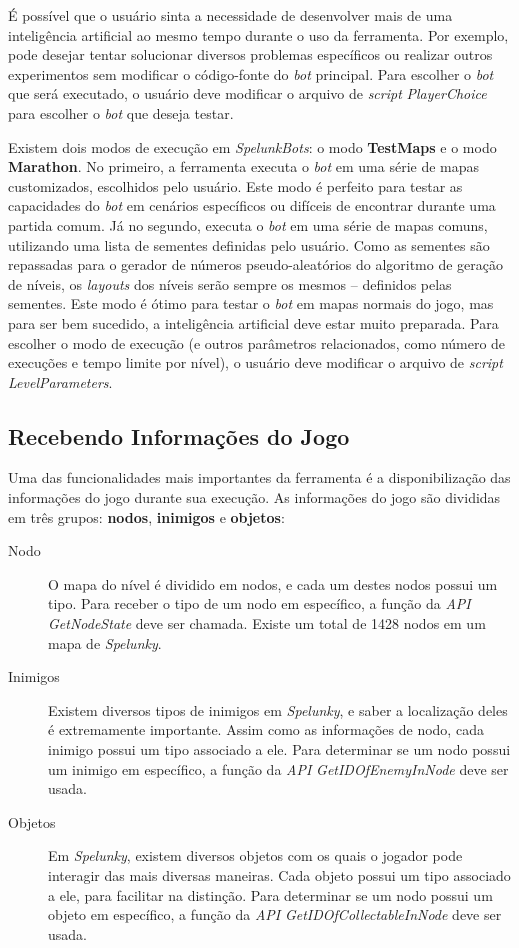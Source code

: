 É possível que o usuário sinta a necessidade de desenvolver mais de uma
inteligência artificial ao mesmo tempo durante o uso da ferramenta.  Por
exemplo, pode desejar tentar solucionar diversos problemas específicos ou
realizar outros experimentos sem modificar o código-fonte do \textit{bot}
principal.  Para escolher o \textit{bot} que será executado, o usuário deve
modificar o arquivo de \textit{script} \textit{PlayerChoice} para escolher o
\textit{bot} que deseja testar.

Existem dois modos de execução em \textit{SpelunkBots}: o modo \textbf{TestMaps}
e o modo \textbf{Marathon}. No primeiro, a ferramenta executa o \textit{bot} em
uma série de mapas customizados, escolhidos pelo usuário. Este modo é perfeito
para testar as capacidades do \textit{bot} em cenários específicos ou difíceis
de encontrar durante uma partida comum. Já no segundo, executa o \textit{bot} em
uma série de mapas comuns, utilizando uma lista de sementes definidas pelo
usuário. Como as sementes são repassadas para o gerador de números
pseudo-aleatórios do algoritmo de geração de níveis, os \textit{layouts} dos
níveis serão sempre os mesmos -- definidos pelas sementes. Este modo é ótimo
para testar o \textit{bot} em mapas normais do jogo, mas para ser bem sucedido,
a inteligência artificial deve estar muito preparada. Para escolher o modo de
execução (e outros parâmetros relacionados, como número de execuções e tempo
limite por nível), o usuário deve modificar o arquivo de \textit{script}
\textit{LevelParameters}.


\subsection{Recebendo Informações do Jogo}
Uma das funcionalidades mais importantes da ferramenta é a disponibilização das
informações do jogo durante sua execução. As informações do jogo são divididas
em três grupos: \textbf{nodos}, \textbf{inimigos} e \textbf{objetos}:

\begin{description}
	\item[Nodo]
		O mapa do nível é dividido em nodos, e cada um destes nodos possui um
		tipo.  Para receber o tipo de um nodo em específico, a função da
		\textit{API} \textit{GetNodeState} deve ser chamada. Existe um total de
		1428 nodos em um mapa de \textit{Spelunky}.

	\item[Inimigos]
		Existem diversos tipos de inimigos em \textit{Spelunky}, e saber a
		localização deles é extremamente importante. Assim como as informações
		de nodo, cada inimigo possui um tipo associado a ele. Para determinar se
		um nodo possui um inimigo em específico, a função da \textit{API}
		\textit{GetIDOfEnemyInNode} deve ser usada.

	\item[Objetos]
		Em \textit{Spelunky}, existem diversos objetos com os quais o jogador
		pode interagir das mais diversas maneiras. Cada objeto possui um tipo
		associado a ele, para facilitar na distinção. Para determinar se um nodo
		possui um objeto em específico, a função da \textit{API}
		\textit{GetIDOfCollectableInNode} deve ser usada.
\end{description}

